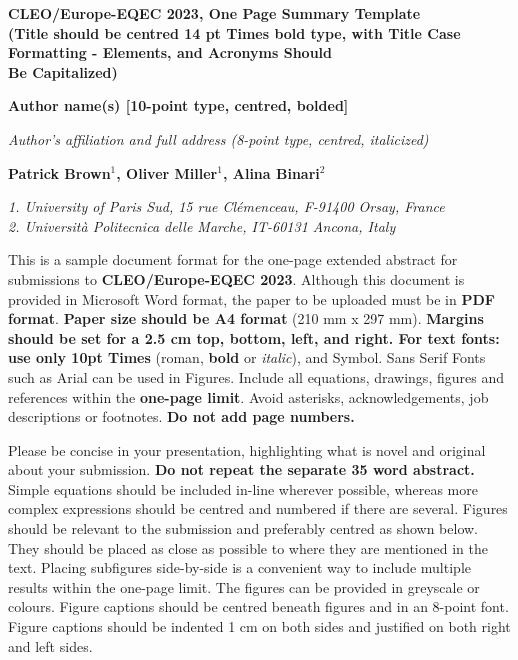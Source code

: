 \documentclass{article}
\begin{document}
\begin{center}
{\Large\bfseries
CLEO\textsuperscript{\textregistered}/Europe-EQEC 2023, One Page Summary Template\\
(Title should be centred 14 pt Times bold type, with Title Case\\
Formatting - Elements, and Acronyms Should\\
Be Capitalized)\par}
\vspace{3ex}
{\bfseries
Author name(s) [10-point type, centred, bolded]\par}
{\footnotesize\itshape
Author’s affiliation and full address (8-point type, centred, italicized)\par}
\vspace{3ex}
{\bfseries
Patrick Brown$^{1}$, Oliver Miller$^{1}$, Alina Binari$^{2}$\par}
{\footnotesize\itshape
1. University of Paris Sud, 15 rue Cl\'emenceau, F-91400 Orsay, France\\
2. Universit\`a Politecnica delle Marche, IT-60131 Ancona, Italy\par}
\vspace{3ex}
\end{center}
This is a sample document format for the one-page extended abstract
for submissions to
\textbf{CLEO\textsuperscript{\textregistered}/Europe-EQEC 2023}.
Although this document is provided in Microsoft Word format, the paper
to be uploaded must be in \textbf{PDF format}. \textbf{Paper size
should be A4 format} (210 mm x 297 mm). \textbf{Margins should be set
for a 2.5 cm top, bottom, left, and right. For text fonts: use only
10pt Times} (roman, \textbf{bold} or \textit{italic}), and Symbol.
Sans Serif Fonts such as Arial can be used in Figures. Include all
equations, drawings, figures and references within the
\textbf{one-page limit}. Avoid asterisks, acknowledgements, job
descriptions or footnotes. \textbf{Do not add page numbers.}

Please be concise in your presentation, highlighting what is novel and
original about your submission. \textbf{Do not repeat the separate 35
word abstract.} Simple equations should be included in-line wherever
possible, whereas more complex expressions should be centred and
numbered if there are several. Figures should be relevant to the
submission and preferably centred as shown below. They should be
placed as close as possible to where they are mentioned in the text.
Placing subfigures side-by-side is a convenient way to include
multiple results within the one-page limit. The figures can be
provided in greyscale or colours. Figure captions should be centred
beneath figures and in an 8-point font. Figure captions should be
indented 1 cm on both sides and justified on both right and left
sides.
\end{document}
